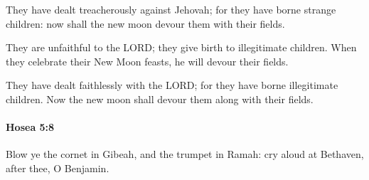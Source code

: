 			\begin{versebox}
					\item[BHS] 
					\item[LXX] 
					\item[ASV] They have dealt treacherously against Jehovah; for they have borne strange children: now shall the new moon devour them with their fields.
					\item[NIV] They are unfaithful to the LORD; they give birth to illegitimate children. When they celebrate their New Moon feasts, he will devour their fields.
					\item[NRSV] They have dealt faithlessly with the LORD; for they have borne illegitimate children. Now the new moon shall devour them along with their fields.
			\end{versebox}

		\paragraph{Hosea 5:8} %
			\label{HOSEA-5-8}

			Blow ye the cornet in Gibeah, and the trumpet in Ramah: cry aloud at Bethaven, after thee, O Benjamin.

